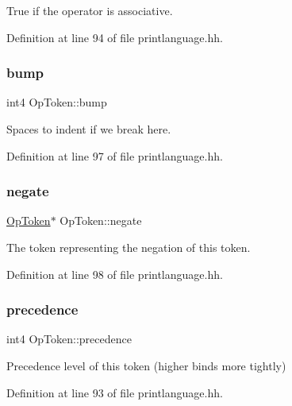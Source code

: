 True if the operator is associative. 



Definition at line 94 of file printlanguage.\+hh.

\mbox{\label{class_op_token_a0bb120db7eb448f0c1ead784548261b1}} 
\subsubsection{\texorpdfstring{bump}{bump}}
{\footnotesize\ttfamily int4 Op\+Token\+::bump}



Spaces to indent if we break here. 



Definition at line 97 of file printlanguage.\+hh.

\mbox{\label{class_op_token_a7bb898ee28b397177f1a47bc2892c9fd}} 
\subsubsection{\texorpdfstring{negate}{negate}}
{\footnotesize\ttfamily \mbox{\hyperlink{class_op_token}{Op\+Token}}$\ast$ Op\+Token\+::negate}



The token representing the negation of this token. 



Definition at line 98 of file printlanguage.\+hh.

\mbox{\label{class_op_token_a6ce4a7a613c9ad8823cf7b25e917589d}} 
\subsubsection{\texorpdfstring{precedence}{precedence}}
{\footnotesize\ttfamily int4 Op\+Token\+::precedence}



Precedence level of this token (higher binds more tightly) 



Definition at line 93 of file printlanguage.\+hh.

\mbox{\label{class_op_token_a73d7c611fcdedb3eac4e74450def8561}} 
